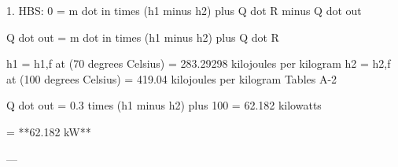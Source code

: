 1. HBS: 0 = m dot in times (h1 minus h2) plus Q dot R minus Q dot out  

Q dot out = m dot in times (h1 minus h2) plus Q dot R  

h1 = h1,f at (70 degrees Celsius) = 283.29298 kilojoules per kilogram  
h2 = h2,f at (100 degrees Celsius) = 419.04 kilojoules per kilogram  
Tables A-2  

Q dot out = 0.3 times (h1 minus h2) plus 100 = 62.182 kilowatts  

= **62.182 kW**  

---